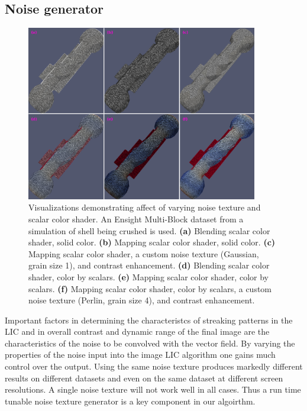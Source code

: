 \documentclass[a4paper,10pt]{article}
\begin{document}
\subsection{Noise generator}
\begin{figure}[ht]
 \centering
 \includegraphics[width=0.9\textwidth]{./images-data/dia-serial/ensight-blow-multiblock-frame.png}
\caption{Visualizations demonstrating affect of varying noise texture and scalar color shader. An Ensight Multi-Block dataset from a simulation of shell being crushed is used.
    {\bf (a)} Blending scalar color shader, solid color.
    {\bf (b)} Mapping scalar color shader, solid color.
    {\bf (c)} Mapping scalar color shader, a custom noise texture (Gaussian, grain size 1), and contrast enhancement.
    {\bf (d)} Blending scalar color shader, color by scalars.
    {\bf (e)} Mapping scalar color shader, color by scalars.
    {\bf (f)} Mapping scalar color shader, color by scalars, a custom noise texture (Perlin, grain size 4), and contrast enhancement.}
 \label{fig:noise}
\end{figure}

Important factors in determining the characteristcs of streaking patterns in the LIC and in overall contrast and dynamic range of the final image are the characteristics of the noise to be convolved with the vector field. By varying the properties of the noise input into the image LIC algorithm one gains much control over the output. Using the same noise texture produces markedly different results on different datasets and even on the same dataset at different screen resolutions. A single noise texture will not work well in all cases. Thus a run time tunable noise texture generator is a key component in our algoirthm. 
\end{document}
